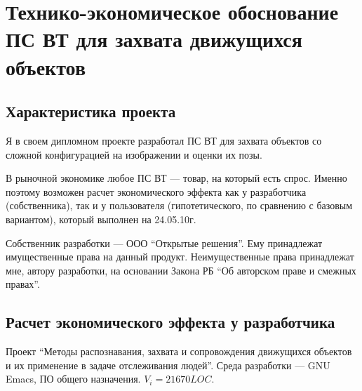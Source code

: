 \section{Технико-экономическое обоснование ПС ВТ для захвата движущихся объектов}

\subsection{Характеристика проекта}
Я в своем дипломном проекте разработал ПС ВТ для захвата объектов со сложной конфигурацией на изображении и оценки их позы.

В рыночной экономике любое ПС ВТ --- товар, на который есть спрос. Именно поэтому возможен расчет экономического эффекта как у разработчика (собственника), так и у пользователя (гипотетического, по сравнению с базовым вариантом), который выполнен на 24.05.10г.

Собственник разработки --- ООО ``Открытые решения''. Ему принадлежат имущественные права на данный продукт. Неимущественные права принадлежат мне, автору разработки, на основании Закона РБ ``Об авторском праве и смежных правах''.

\subsection{Расчет экономического эффекта у разработчика}
Проект ``Методы распознавания, захвата и сопровождения движущихся объектов и их применение в задаче отслеживания людей''. Среда разработки --- GNU Emacs, ПО общего назначения. \( V_i = 21670 LOC \).

